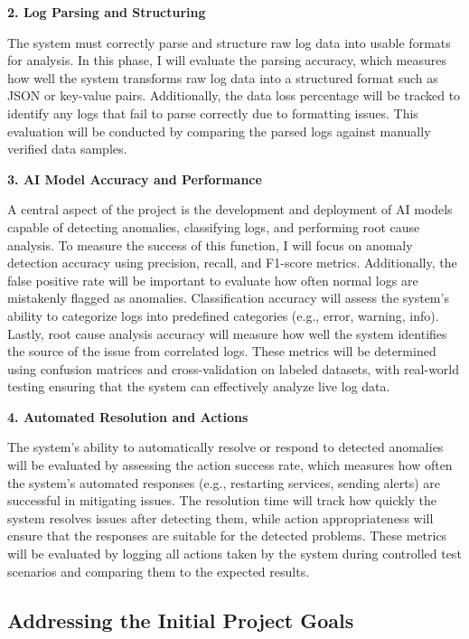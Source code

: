 \textbf{2. Log Parsing and Structuring}


The system must correctly parse and structure raw log data into usable formats for analysis. In this phase, I will evaluate the parsing accuracy, which measures how well the system transforms raw log data into a structured format such as JSON or key-value pairs. Additionally, the data loss percentage will be tracked to identify any logs that fail to parse correctly due to formatting issues. This evaluation will be conducted by comparing the parsed logs against manually verified data samples.

\textbf{3. AI Model Accuracy and Performance}


A central aspect of the project is the development and deployment of AI models capable of detecting anomalies, classifying logs, and performing root cause analysis. To measure the success of this function, I will focus on anomaly detection accuracy using precision, recall, and F1-score metrics. Additionally, the false positive rate will be important to evaluate how often normal logs are mistakenly flagged as anomalies. Classification accuracy will assess the system's ability to categorize logs into predefined categories (e.g., error, warning, info). Lastly, root cause analysis accuracy will measure how well the system identifies the source of the issue from correlated logs. These metrics will be determined using confusion matrices and cross-validation on labeled datasets, with real-world testing ensuring that the system can effectively analyze live log data.



\textbf{4. Automated Resolution and Actions}


The system’s ability to automatically resolve or respond to detected anomalies will be evaluated by assessing the action success rate, which measures how often the system’s automated responses (e.g., restarting services, sending alerts) are successful in mitigating issues. The resolution time will track how quickly the system resolves issues after detecting them, while action appropriateness will ensure that the responses are suitable for the detected problems. These metrics will be evaluated by logging all actions taken by the system during controlled test scenarios and comparing them to the expected results.



\subsection{Addressing the Initial Project Goals}

